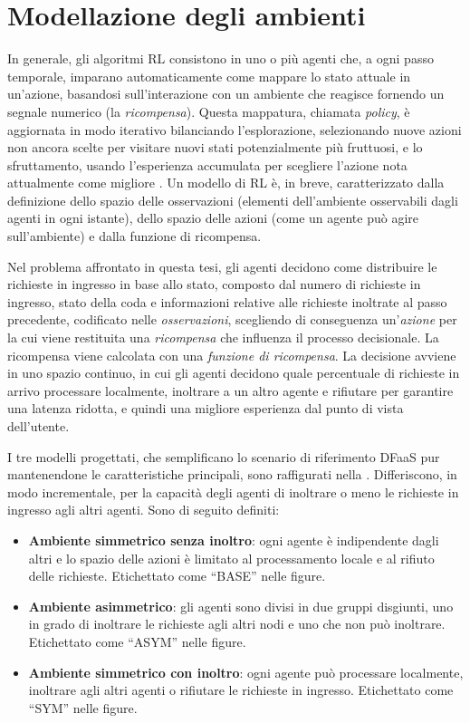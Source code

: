 \documentclass[a4paper, twocolumn]{article}
\begin{document}
\section{Modellazione degli ambienti}

In generale, gli algoritmi RL consistono in uno o più agenti che, a ogni passo temporale, imparano automaticamente come mappare lo stato attuale in un'azione, basandosi sull'interazione con un ambiente che reagisce fornendo un segnale numerico (la \textit{ricompensa}). Questa mappatura, chiamata \textit{policy}, è aggiornata in modo iterativo bilanciando l'esplorazione, selezionando nuove azioni non ancora scelte per visitare nuovi stati potenzialmente più fruttuosi, e lo sfruttamento, usando l'esperienza accumulata per scegliere l'azione nota attualmente come migliore \cite{Sutton2018}. Un modello di RL è, in breve, caratterizzato dalla definizione dello spazio delle osservazioni (elementi dell'ambiente osservabili dagli agenti in ogni istante), dello spazio delle azioni (come un agente può agire sull'ambiente) e dalla funzione di ricompensa.

Nel problema affrontato in questa tesi, gli agenti decidono come distribuire le richieste in ingresso in base allo stato, composto dal numero di richieste in ingresso, stato della coda e informazioni relative alle richieste inoltrate al passo precedente, codificato nelle \textit{osservazioni}, scegliendo di conseguenza un'\textit{azione} per la cui viene restituita una \textit{ricompensa} che influenza il processo decisionale. La ricompensa viene calcolata con una \textit{funzione di ricompensa}. La decisione avviene in uno spazio continuo, in cui gli agenti decidono quale percentuale di richieste in arrivo processare localmente, inoltrare a un altro agente e rifiutare per garantire una latenza ridotta, e quindi una migliore esperienza dal punto di vista dell'utente.

I tre modelli progettati, che semplificano lo scenario di riferimento DFaaS pur mantenendone le caratteristiche principali, sono raffigurati nella . Differiscono, in modo incrementale, per la capacità degli agenti di inoltrare o meno le richieste in ingresso agli altri agenti. Sono di seguito definiti:

\begin{itemize}
    \item \textbf{Ambiente simmetrico senza inoltro}: ogni agente è indipendente dagli altri e lo spazio delle azioni è limitato al processamento locale e al rifiuto delle richieste. Etichettato come ``BASE'' nelle figure.

    \item \textbf{Ambiente asimmetrico}: gli agenti sono divisi in due gruppi disgiunti, uno in grado di inoltrare le richieste agli altri nodi e uno che non può inoltrare. Etichettato come ``ASYM'' nelle figure.

    \item \textbf{Ambiente simmetrico con inoltro}: ogni agente può processare localmente, inoltrare agli altri agenti o rifiutare le richieste in ingresso. Etichettato come ``SYM'' nelle figure.
\end{itemize}
\end{document}
